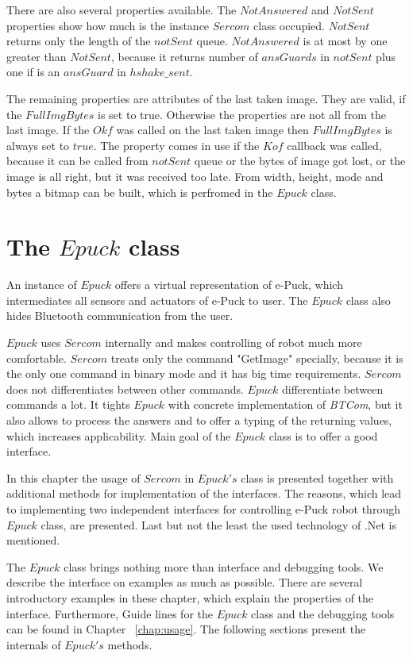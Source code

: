 	There are also several properties available. The $NotAnswered$ and $NotSent$ properties
	show how much is the instance $Sercom$ class occupied. $NotSent$ returns only the length of the $notSent$ queue. 
	$NotAnswered$ is at most by one greater than $NotSent$,
	because it returns number of $ansGuards$ in $notSent$ plus one if is an $ansGuard$ in $hshake\_sent$.

	The remaining properties are attributes of the last taken image. They are valid, if the $FullImgBytes$ is set to true.
	Otherwise the properties are not all from the last image.
	If the $Okf$ was called on the last taken image then $FullImgBytes$ is always set to $true$. The property
	comes in use if the $Kof$ callback was called, because it can be called from $notSent$ queue 
	or the bytes of image got lost, or the image is all right, but it was received too late. 
	From width, height, mode and bytes a bitmap can be built, which is perfromed
	in the $Epuck$ class.

\section{The $Epuck$ class} \label{sec:epuck}
	An instance of $Epuck$ offers a virtual representation of e-Puck,
	which intermediates all sensors and actuators of e-Puck to user. 
	The $Epuck$ class also hides Bluetooth communication from the user.

	$Epuck$ uses $Sercom$ internally and makes controlling of robot much more comfortable.
	$Sercom$ treats only the command "GetImage" specially, because it is the only one command in binary mode
	and it has big time requirements. $Sercom$ does not differentiates between other commands.
	$Epuck$ differentiate between commands a lot. It tights $Epuck$ with concrete implementation of {\it BTCom},
	but it also allows to process the answers and to offer a typing of the returning values, which increases
	applicability. Main goal of the $Epuck$ class is to offer a good interface.

	In this chapter the usage of $Sercom$ in $Epuck's$ class is presented together with additional methods 
	for implementation of the interfaces. The reasons, which lead to implementing two independent interfaces for
	controlling e-Puck robot through $Epuck$ class, are presented.
	Last but not the least the used technology of .Net is mentioned.

	The $Epuck$ class brings nothing more than interface and debugging tools. We describe the interface
	on examples as much as possible. There are several introductory examples in these chapter,
	which explain the properties of the interface. Furthermore, 
	Guide lines for the $Epuck$ class and the debugging
	tools can be found in Chapter ~\ref{chap:usage}.
	The following sections present the internals of $Epuck's$ methods.
	
